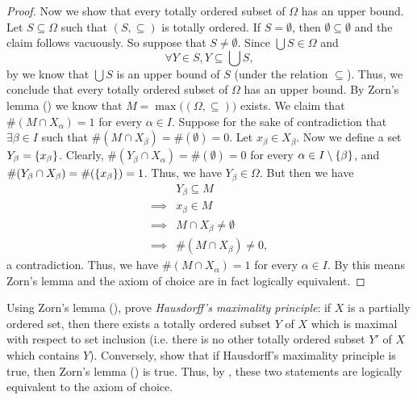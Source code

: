 \begin{proof}
  Now we show that every totally ordered subset of \(\Omega\) has an upper bound.
  Let \(S \subseteq \Omega\) such that \((S, \subseteq)\) is totally ordered.
  If \(S = \emptyset\), then \(\emptyset \subseteq \emptyset\) and the claim follows vacuously.
  So suppose that \(S \neq \emptyset\).
  Since \(\bigcup S \in \Omega\) and
  \[
    \forall Y \in S, Y \subseteq \bigcup S,
  \]
  by  we know that \(\bigcup S\) is an upper bound of \(S\) (under the relation \(\subseteq\)).
  Thus, we conclude that every totally ordered subset of \(\Omega\) has an upper bound.
  By Zorn's lemma () we know that \(M = \max\big((\Omega, \subseteq)\big)\) exists.
  We claim that \(\#(M \cap X_{\alpha}) = 1\) for every \(\alpha \in I\).
  Suppose for the sake of contradiction that \(\exists \beta \in I\) such that \(\#(M \cap X_{\beta}) = \#(\emptyset) = 0\).
  Let \(x_{\beta} \in X_{\beta}\).
  Now we define a set \(Y_{\beta} = \left\lbrace x_{\beta}\right\rbrace\).
  Clearly, \(\#(Y_{\beta} \cap X_{\alpha}) = \#(\emptyset) = 0\) for every \(\alpha \in I \setminus \left\lbrace\beta\right\rbrace\), and \(\#(Y_{\beta} \cap X_{\beta}) = \#(\left\lbrace x_{\beta}\right\rbrace) = 1\).
  Thus, we have \(Y_{\beta} \in \Omega\).
  But then we have
  \begin{align*}
             & Y_{\beta} \subseteq M           \\
    \implies & x_{\beta} \in M                 \\
    \implies & M \cap X_{\beta} \neq \emptyset \\
    \implies & \#(M \cap X_{\beta}) \neq 0,
  \end{align*}
  a contradiction.
  Thus, we have \(\#(M \cap X_{\alpha}) = 1\) for every \(\alpha \in I\).
  By  this means Zorn's lemma and the axiom of choice are in fact logically equivalent.
\end{proof}

\begin{ex}\label{i:ex:8.5.18}
  Using Zorn's lemma (), prove \emph{Hausdorff's maximality principle}:
  if \(X\) is a partially ordered set, then there exists a totally ordered subset \(Y\) of \(X\) which is maximal with respect to set inclusion
  (i.e. there is no other totally ordered subset \(Y'\) of \(X\) which contains \(Y\)).
  Conversely, show that if Hausdorff's maximality principle is true, then Zorn's lemma () is true.
  Thus, by , these two statements are logically equivalent to the axiom of choice.
\end{ex}

